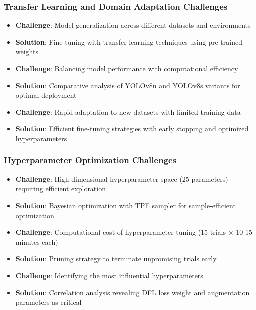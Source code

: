 \documentclass[12pt,a4paper]{article}
\begin{document}
\subsubsection{Transfer Learning and Domain Adaptation Challenges}
\begin{itemize}
    \item \textbf{Challenge}: Model generalization across different datasets and environments
    \item \textbf{Solution}: Fine-tuning with transfer learning techniques using pre-trained weights
    \item \textbf{Challenge}: Balancing model performance with computational efficiency
    \item \textbf{Solution}: Comparative analysis of YOLOv8n and YOLOv8s variants for optimal deployment
    \item \textbf{Challenge}: Rapid adaptation to new datasets with limited training data
    \item \textbf{Solution}: Efficient fine-tuning strategies with early stopping and optimized hyperparameters
\end{itemize}

\subsubsection{Hyperparameter Optimization Challenges}
\begin{itemize}
    \item \textbf{Challenge}: High-dimensional hyperparameter space (25 parameters) requiring efficient exploration
    \item \textbf{Solution}: Bayesian optimization with TPE sampler for sample-efficient optimization
    \item \textbf{Challenge}: Computational cost of hyperparameter tuning (15 trials × 10-15 minutes each)
    \item \textbf{Solution}: Pruning strategy to terminate unpromising trials early
    \item \textbf{Challenge}: Identifying the most influential hyperparameters
    \item \textbf{Solution}: Correlation analysis revealing DFL loss weight and augmentation parameters as critical
\end{itemize}
\end{document}
